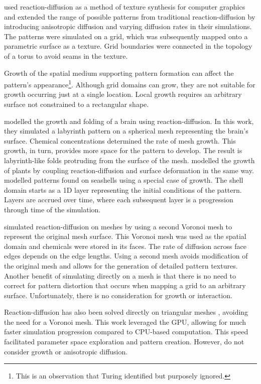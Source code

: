 \citet{witkin1991} used reaction-diffusion as a method of texture synthesis for computer graphics and extended the range of possible patterns from traditional reaction-diffusion by introducing anisotropic diffusion and varying diffusion rates in their simulations. The patterns were simulated on a grid, which was subsequently mapped onto a parametric surface as a texture. Grid boundaries were connected in the topology of a torus to avoid seams in the texture.

Growth of the spatial medium supporting pattern formation can affect the pattern's appearance\footnote{This is an observation that Turing identified but purposely ignored.}. Although grid domains can grow, they are not suitable for growth occurring just at a single location. Local growth requires an arbitrary surface not constrained to a rectangular shape.

\citet{lefevre2010} modelled the growth and folding of a brain using reaction-diffusion. In this work, they simulated a labyrinth pattern on a spherical mesh representing the brain's surface. Chemical concentrations determined the rate of mesh growth. This growth, in turn, provides more space for the pattern to develop. The result is labyrinth-like folds protruding from the surface of the mesh. \citet{harrison2002, holloway2007} modelled the growth of plants by coupling reaction-diffusion and surface deformation in the same way. \citet{fowler1992} modelled patterns found on seashells using a special case of growth. The shell domain starts as a 1D layer representing the initial conditions of the pattern. Layers are accrued over time, where each subsequent layer is a progression through time of the simulation.

\citet{turk1991} simulated reaction-diffusion on meshes by using a second Voronoi mesh to represent the original mesh surface. This Voronoi mesh was used as the spatial domain and chemicals were stored in its faces. The rate of diffusion across face edges depends on the edge lengths. Using a second mesh avoids modification of the original mesh and allows for the generation of detailed pattern textures. Another benefit of simulating directly on a mesh is that there is no need to correct for pattern distortion that occurs when mapping a grid to an arbitrary surface. Unfortunately, there is no consideration for growth or interaction. %

Reaction-diffusion has also been solved directly on triangular meshes \citep{descombes2016}, avoiding the need for a Voronoi mesh. This work leveraged the GPU, allowing for much faster simulation progression compared to CPU-based computation. This speed facilitated parameter space exploration and pattern creation. However, \citet{descombes2016} do not consider growth or anisotropic diffusion.

